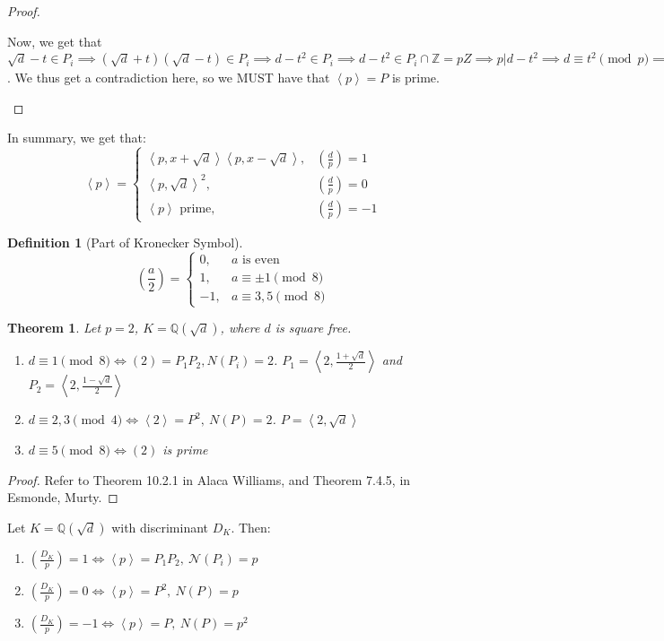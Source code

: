 \documentclass{article}
\newcommand{\lgs}[2]{\left(\frac{#1}{#2}\right)}
\newcommand{\la}{\left\langle}
\newcommand{\ra}{\right\rangle}
\newcommand{\Q}{\mathbb{Q}}
\newcommand{\Z}{\mathbb{Z}}
\newcommand{\N}{\mathcal{N}}
\newtheorem{theorem}{Theorem}[subsection]
\newtheorem{definition}{Definition}[subsection]
\begin{document}
\begin{proof}
\begin{enumerate}[1)]
    Now, we get that $\sqrt{d}-t\in P_i\implies (\sqrt{d}+t)(\sqrt{d}-t)\in P_i\implies d-t^2\in P_i\implies d-t^2\in P_i\cap \Z=pZ\implies p|d-t^2\implies d\equiv t^2\pmod{p}\implies \lgs{d}{p}=1$. We thus get a contradiction here, so we MUST have that $\la p\ra =P$ is prime.
\end{enumerate}
\end{proof}
In summary, we get that:
\begin{equation*}
    \la p\ra =
    \begin{cases}
    \la p,x+\sqrt{d}\ra\la p,x-\sqrt{d}\ra, &\lgs{d}{p}=1\\
    \la p,\sqrt{d}\ra^2, &\lgs{d}{p}=0\\
    \la p\ra \text{ prime}, &\lgs{d}{p}=-1
    \end{cases}
\end{equation*}
\begin{definition}[Part of Kronecker Symbol]
\begin{equation*}
    \lgs{a}{2} =
    \begin{cases}
    0, &\text{$a$ is even}\\
    1, &a\equiv\pm 1\pmod{8}\\
    -1, &a\equiv 3,5\pmod{8}
    \end{cases}
\end{equation*}
\end{definition}
\begin{theorem}
Let $p=2$, $K=\Q(\sqrt{d})$, where $d$ is square free. 
\begin{enumerate}[1)]
    \item $d\equiv 1\pmod{8}\iff (2)=P_1P_2, N(P_i)=2$. $P_1=\la 2,\frac{1+\sqrt{d}}{2}\ra$ and $P_2=\la 2,\frac{1-\sqrt{d}}{2}\ra$
    \item $d\equiv 2,3\pmod{4}\iff \la 2\ra = P^2,\ N(P)=2$. $P=\la 2,\sqrt{d}\ra$
    \item $d\equiv 5\pmod{8}\iff (2)$ is prime
\end{enumerate}
\end{theorem}
\begin{proof}
Refer to Theorem 10.2.1 in Alaca Williams, and Theorem 7.4.5, in Esmonde, Murty.
\end{proof}
Let $K=\Q(\sqrt{d})$ with discriminant $D_K$. Then:
\begin{enumerate}[1)]
    \item $\left(\frac{D_K}{p}\right)=1\iff \la p\ra = P_1P_2,\ \N(P_i)=p$\qquad {}
    \item $\left(\frac{D_K}{p}\right)=0\iff \la p\ra = P^2,\ N(P)=p$\qquad {}
    \item $\left(\frac{D_K}{p}\right)=-1\iff \la p\ra = P,\ N(P)=p^2$\qquad {}
\end{enumerate}
\newpage
\end{document}
